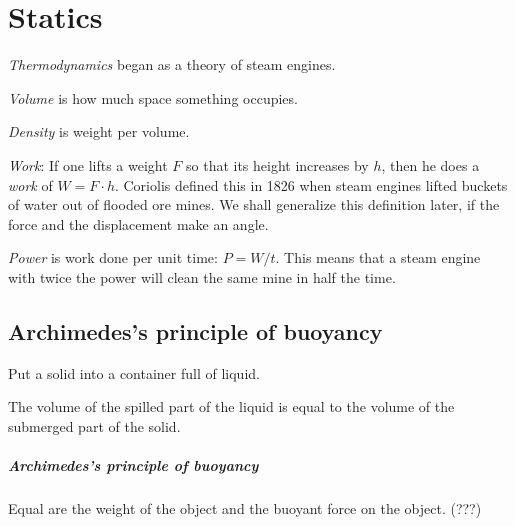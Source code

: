 \chapter{Statics}


\emph{Thermodynamics} began as a theory of steam engines.

\emph{Volume} is how much space something occupies.

\emph{Density} is weight per volume.

%
%
\emph{Work}: If one lifts a weight \(F\) so that its height increases by \(h\),
then he does a \emph{work} of \( W = F \cdot h \).
Coriolis defined this in 1826 \cite{coriolis1829calcul}
when steam engines lifted buckets of water out of flooded ore mines.
We shall generalize this definition later,
if the force and the displacement make an angle.

%
%
\emph{Power} is work done per unit time: \( P = W / t \).
This means that a steam engine with twice the power
will clean the same mine in half the time.


\section{Archimedes's principle of buoyancy}


Put a solid into a container full of liquid.

The volume of the spilled part of the liquid is equal to
the volume of the submerged part of the solid.

%
%
%
\paragraph{Archimedes's principle of buoyancy}
Equal are the weight of the object and the buoyant force on the object.
(???)

